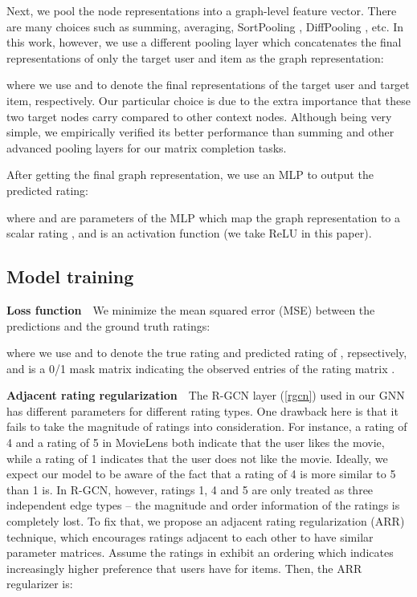 \documentclass{article} \usepackage{iclr2020_conference,times}
\begin{document}
Next, we pool the node representations into a graph-level feature vector. There are many choices such as summing, averaging, SortPooling \citep{zhang2018end}, DiffPooling \citep{ying2018hierarchical}, etc. In this work, however, we use a different pooling layer which concatenates the final representations of only the target user and item as the graph representation:

where we use  and  to denote the final representations of the target user and target item, respectively. Our particular choice is due to the extra importance that these two target nodes carry compared to other context nodes. Although being very simple, we empirically verified its better performance than summing and other advanced pooling layers for our matrix completion tasks.

After getting the final graph representation, we use an MLP to output the predicted rating:

where  and  are parameters of the MLP which map the graph representation  to a scalar rating , and  is an activation function (we take ReLU in this paper).



\subsection{Model training}
\noindent \textbf{Loss function}~~We minimize the mean squared error (MSE) between the predictions and the ground truth ratings:

where we use  and  to denote the true rating and predicted rating of , repsectively, and  is a 0/1 mask matrix indicating the observed entries of the rating matrix .

\noindent \textbf{Adjacent rating regularization}~~The R-GCN layer (\ref{rgcn}) used in our GNN has different parameters  for different rating types. One drawback here is that it fails to take the magnitude of ratings into consideration. For instance, a rating of 4 and a rating of 5 in MovieLens both indicate that the user likes the movie, while a rating of 1 indicates that the user does not like the movie. Ideally, we expect our model to be aware of the fact that a rating of 4 is more similar to 5 than 1 is. In R-GCN, however, ratings 1, 4 and 5 are only treated as three independent edge types -- the magnitude and order information of the ratings is completely lost. To fix that, we propose an adjacent rating regularization (ARR) technique, which encourages ratings adjacent to each other to have similar parameter matrices. Assume the ratings in  exhibit an ordering  which indicates increasingly higher preference that users have for items. Then, the ARR regularizer is:
\end{document}
